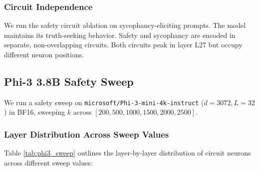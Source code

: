 \documentclass[11pt]{article}
\begin{document}
\subsubsection{Circuit Independence}
We run the safety circuit ablation on sycophancy-eliciting prompts. The model maintains its truth-seeking behavior. Safety and sycophancy are encoded in separate, non-overlapping circuits. Both circuits peak in layer L27 but occupy different neuron positions.

\subsection{Phi-3 3.8B Safety Sweep}

We run a safety sweep on \texttt{microsoft/Phi-3-mini-4k-instruct} ($d=3072, L=32$) in BF16, sweeping $k$ across $[200, 500, 1000, 1500, 2000, 2500]$.

\subsubsection{Layer Distribution Across Sweep Values}
Table \ref{tab:phi3_sweep} outlines the layer-by-layer distribution of circuit neurons across different sweep values:

\begin{table}[h]
\centering
\caption{Phi-3 Safety Circuit Layer Distribution}
\label{tab:phi3_sweep}
\end{table}
\end{document}
